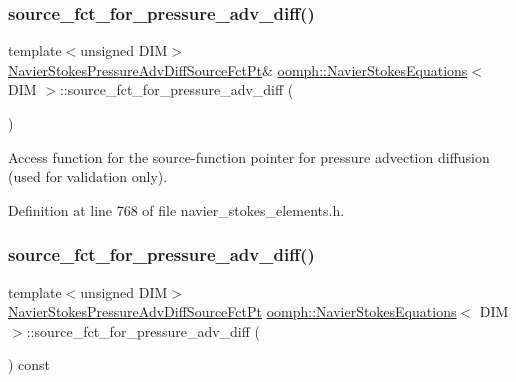 \subsubsection{\texorpdfstring{source\+\_\+fct\+\_\+for\+\_\+pressure\+\_\+adv\+\_\+diff()}{source\_fct\_for\_pressure\_adv\_diff()}\hspace{0.1cm}{\footnotesize\ttfamily [1/2]}}
{\footnotesize\ttfamily template$<$unsigned D\+IM$>$ \\
\hyperlink{classoomph_1_1NavierStokesEquations_ae97e12328a88431038ccb321ee6d0c73}{Navier\+Stokes\+Pressure\+Adv\+Diff\+Source\+Fct\+Pt}\& \hyperlink{classoomph_1_1NavierStokesEquations}{oomph\+::\+Navier\+Stokes\+Equations}$<$ D\+IM $>$\+::source\+\_\+fct\+\_\+for\+\_\+pressure\+\_\+adv\+\_\+diff (\begin{DoxyParamCaption}{ }\end{DoxyParamCaption})\hspace{0.3cm}{\ttfamily [inline]}}



Access function for the source-\/function pointer for pressure advection diffusion (used for validation only). 



Definition at line 768 of file navier\+\_\+stokes\+\_\+elements.\+h.

\mbox{\label{classoomph_1_1NavierStokesEquations_a7e3bace21eae7a6ce139ae9ed842acb1}} 
\subsubsection{\texorpdfstring{source\+\_\+fct\+\_\+for\+\_\+pressure\+\_\+adv\+\_\+diff()}{source\_fct\_for\_pressure\_adv\_diff()}\hspace{0.1cm}{\footnotesize\ttfamily [2/2]}}
{\footnotesize\ttfamily template$<$unsigned D\+IM$>$ \\
\hyperlink{classoomph_1_1NavierStokesEquations_ae97e12328a88431038ccb321ee6d0c73}{Navier\+Stokes\+Pressure\+Adv\+Diff\+Source\+Fct\+Pt} \hyperlink{classoomph_1_1NavierStokesEquations}{oomph\+::\+Navier\+Stokes\+Equations}$<$ D\+IM $>$\+::source\+\_\+fct\+\_\+for\+\_\+pressure\+\_\+adv\+\_\+diff (\begin{DoxyParamCaption}{ }\end{DoxyParamCaption}) const\hspace{0.3cm}{\ttfamily [inline]}}



